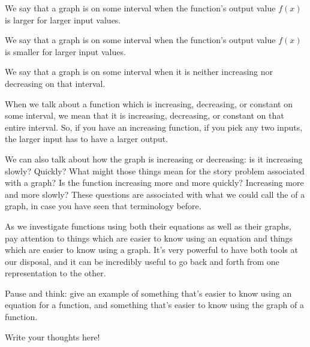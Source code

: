 \documentclass{ximera}
\begin{document}
\begin{definition}
We say that a graph is  on some interval when the function's output value $f(x)$ is larger for larger input values.

We say that a graph is  on some interval when the function's output value $f(x)$ is smaller for larger input values.

We say that a graph is  on some interval when it is neither increasing nor decreasing on that interval.
\end{definition}
When we talk about a function which is increasing, decreasing, or constant on some interval, we mean that it is increasing, decreasing, or constant on that entire interval. So, if you have an increasing function, if you pick any two inputs, the larger input has to have a larger output.

We can also talk about how the graph is increasing or decreasing: is it increasing slowly? Quickly? What might those things mean for the story problem associated with a graph? Is the function increasing more and more quickly? Increasing more and more slowly? These questions are associated with what we could call the  of a graph, in case you have seen that terminology before.

As we investigate functions using both their equations as well as their graphs, pay attention to things which are easier to know using an equation and things which are easier to know using a graph. It's very powerful to have both tools at our disposal, and it can be incredibly useful to go back and forth from one representation to the other.
\begin{question}
Pause and think: give an example of something that's easier to know using an equation for a function, and something that's easier to know using the graph of a function.
\begin{freeResponse}
Write your thoughts here!
\end{freeResponse}
\end{question}
\end{document}
